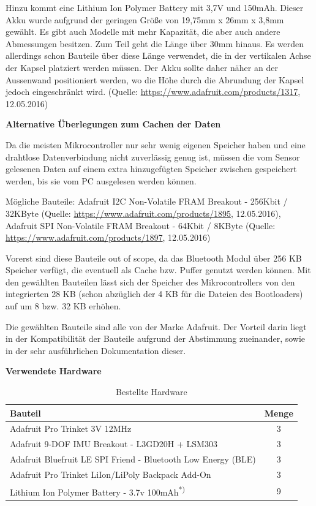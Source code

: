 {Hinzu kommt eine Lithium Ion Polymer Battery mit 3,7V und 150mAh. Dieser Akku wurde aufgrund der geringen Größe von 19,75mm x 26mm x 3,8mm gewählt. Es gibt auch Modelle mit mehr Kapazität, die aber auch andere Abmessungen besitzen. Zum Teil geht die Länge über 30mm hinaus. Es werden allerdings schon Bauteile über diese Länge verwendet, die in der vertikalen Achse der Kapsel platziert werden müssen. Der Akku sollte daher näher an der Aussenwand positioniert werden, wo die Höhe durch die Abrundung der Kapsel jedoch eingeschränkt wird. (Quelle: \url{https://www.adafruit.com/products/1317}, 12.05.2016)

\textbf{Alternative Überlegungen zum Cachen der Daten}

Da die meisten Mikrocontroller nur sehr wenig eigenen Speicher haben und eine drahtlose Datenverbindung nicht zuverlässig genug ist, müssen die vom Sensor gelesenen Daten auf einem extra hinzugefügten Speicher zwischen gespeichert werden, bis sie vom PC ausgelesen werden können.

Mögliche Bauteile: Adafruit I2C Non-Volatile FRAM Breakout - 256Kbit / 32KByte (Quelle: \url{https://www.adafruit.com/products/1895}, 12.05.2016), Adafruit SPI Non-Volatile FRAM Breakout - 64Kbit / 8KByte (Quelle: \url{https://www.adafruit.com/products/1897}, 12.05.2016) 

Vorerst sind diese Bauteile out of scope, da das Bluetooth Modul über 256 KB Speicher verfügt, die eventuell als Cache bzw. Puffer genutzt werden können.
Mit den gewählten Bauteilen lässt sich der Speicher des Mikrocontrollers von den integrierten 28 KB (schon abzüglich der 4 KB für die Dateien des Bootloaders) auf um 8 bzw. 32  KB erhöhen. 

Die gewählten Bauteile sind alle von der Marke Adafruit. Der Vorteil darin liegt in der Kompatibilität der Bauteile aufgrund der Abstimmung zueinander, sowie in der sehr ausführlichen Dokumentation dieser. 

\textbf{Verwendete Hardware}

\begin{table}[h]
	\centering
	\begin{tabular}{|l|c|}
		\hline
		\textbf{Bauteil} & \textbf{Menge} \\
		\hline
		 Adafruit Pro Trinket 3V 12MHz & 3 \\
		 \hline
		 Adafruit 9-DOF IMU Breakout - L3GD20H + LSM303 & 3 \\
		 \hline
		 Adafruit Bluefruit LE SPI Friend - Bluetooth Low Energy (BLE) & 3 \\
		 \hline
		 Adafruit Pro Trinket LiIon/LiPoly Backpack Add-On & 3 \\
		 \hline
		 Lithium Ion Polymer Battery - 3.7v 100mAh\textsuperscript{*)} & 9 \\
		 \hline		 
	\end{tabular}
		\caption{Bestellte Hardware}
		\label{tab:bestellteHW}
\end{table}

}
